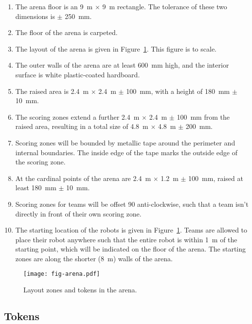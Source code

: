 \begin{enumerate}
  \item The arena floor is an \SI{9}{m} $\times$ \SI{9}{m} rectangle. The
        tolerance of these two dimensions is $\pm$ \SI{250}{mm}.
  \item The floor of the arena is carpeted.
  \item The layout of the arena is given in Figure~\ref{fig:arena}. This
        figure is to scale.
  \item The outer walls of the arena are at least \SI{600}{mm} high, and the
        interior surface is white plastic-coated hardboard.
  \item The raised area is \SI{2.4}{m} $\times$ \SI{2.4}{m} $\pm$ \SI{100}{mm},
        with a height of \SI{180}{mm} $\pm$ \SI{10}{mm}.
  \item The scoring zones extend a further \SI{2.4}{m} $\times$ \SI{2.4}{m} $\pm$ \SI{100}{mm}
        from the raised area, resulting in a total size of \SI{4.8}{m} $\times$ \SI{4.8}{m} $\pm$ \SI{200}{mm}.
  \item Scoring zones will be bounded by metallic tape around the perimeter
        and internal boundaries. The inside edge of the tape marks the outside
        edge of the scoring zone.
  \item At the cardinal points of the arena are \SI{2.4}{m} $\times$ \SI{1.2}{m} $\pm$ \SI{100}{mm},
        raised at least \SI{180}{mm} $\pm$ \SI{10}{mm}.
  \item Scoring zones for teams will be offset 90\degree{} anti-clockwise, such
        that a team isn't directly in front of their own scoring zone.
  \item The starting location of the robots is given in Figure~\ref{fig:arena}.
        Teams are allowed to place their robot anywhere such that the entire
        robot is within \SI{1}{m} of the starting point, which will be
        indicated on the floor of the arena. The starting zones are along the
        shorter (\SI{8}{m}) walls of the arena.
\end{enumerate}

\begin{figure}
  \texttt{[image: fig-arena.pdf]}
  \caption{Layout zones and tokens in the arena.}
  \label{fig:arena}
\end{figure}

\subsection{Tokens}
\label{spec:tokens}

